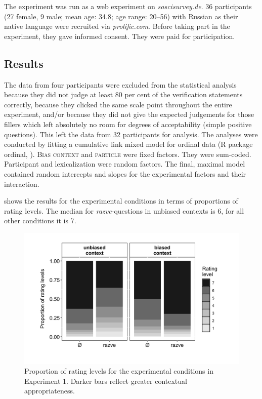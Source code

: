 \documentclass[output=paper,colorlinks,citecolor=brown]{langscibook}
\begin{document}
The experiment was run as a web experiment on \textit{soscisurvey.de}. 36 participants (27 female, 9 male; mean age: 34.8; age range: 20--56) with Russian as their native language were recruited via \textit{prolific.com}. Before taking part in the experiment, they gave informed consent. They were paid for participation.

\subsection{Results}\label{sec:05:4:2}

The data from four participants were excluded from the statistical analysis because they did not judge at least 80 per cent of the verification statements correctly, because they clicked the same scale point throughout the entire experiment, and/or because they did not give the expected judgements for those fillers which left absolutely no room for degrees of acceptability (simple positive questions). This left the data from 32 participants for analysis. The analyses were conducted by fitting a cumulative link mixed model for ordinal data (R package ordinal, \citealt{christ19}). \textsc{Bias context} and \textsc{particle} were fixed factors. They were sum-coded. Participant and lexicalization were random factors. The final, maximal model contained random intercepts and slopes for the experimental factors and their interaction.  

 shows the results for the experimental conditions in terms of proportions of rating levels. The median for \textit{razve}-questions in unbiased contexts is 6, for all other conditions it is 7. 

\begin{figure}
\includegraphics[height=.3\textheight]{figures/ch11-1.png}
\caption{Proportion of rating levels for the experimental conditions in Experiment 1. Darker bars reflect greater contextual appropriateness.}\label{fig:1}
\end{figure}
\end{document}
